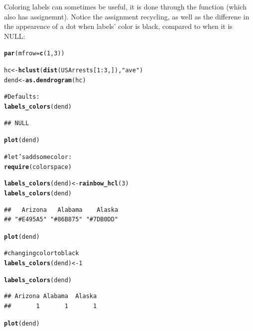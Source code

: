 \documentclass[shortnames,nojss,article]{jss}\usepackage{graphicx, color}
\makeatletter
\newcommand{\hlfunctioncall}[1]{\textcolor[rgb]{0.501960784313725,0,0.329411764705882}{\textbf{#1}}}%
\newcommand{\hlstring}[1]{\textcolor[rgb]{0.6,0.6,1}{#1}}%
\newcommand{\hlcomment}[1]{\textcolor[rgb]{0.180392156862745,0.6,0.341176470588235}{#1}}%
\newenvironment{kframe}{%
 \def\at@end@of@kframe{}%
 \ifinner\ifhmode%
  \def\at@end@of@kframe{\end{minipage}}%
  \begin{minipage}{\columnwidth}%
 \fi\fi%
 \def\FrameCommand##1{\hskip\@totalleftmargin \hskip-\fboxsep
 \colorbox{shadecolor}{##1}\hskip-\fboxsep
     \hskip-\linewidth \hskip-\@totalleftmargin \hskip\columnwidth}%
 \MakeFramed {\advance\hsize-\width
   \@totalleftmargin\z@ \linewidth\hsize
   \@setminipage}}%
 {\par\unskip\endMakeFramed%
 \at@end@of@kframe}
\newenvironment{knitrout}{}{} %
\makeatother
\begin{document}
Coloring labels can sometimes be useful, it is done through the  function (which also has assignemnt). Notice the assignment recycling, as well as the differene in the appearence of a dot when labels' color is black, compared to when it is NULL:

\begin{knitrout}
\color{fgcolor}\begin{kframe}
\begin{alltt}

\hlfunctioncall{par}(mfrow = \hlfunctioncall{c}(1, 3))

hc <- \hlfunctioncall{hclust}(\hlfunctioncall{dist}(USArrests[1:3, ]), \hlstring{"ave"})
dend <- \hlfunctioncall{as.dendrogram}(hc)

\hlcomment{# Defaults:}
\hlfunctioncall{labels_colors}(dend)
\end{alltt}
\begin{verbatim}
## NULL
\end{verbatim}
\begin{alltt}
\hlfunctioncall{plot}(dend)

\hlcomment{# let's add some color:}
\hlfunctioncall{require}(colorspace)
\end{alltt}


{\ttfamily\noindent\itshape\color{messagecolor}{\#\# Loading required package: colorspace}}\begin{alltt}
\hlfunctioncall{labels_colors}(dend) <- \hlfunctioncall{rainbow_hcl}(3)
\hlfunctioncall{labels_colors}(dend)
\end{alltt}
\begin{verbatim}
##   Arizona   Alabama    Alaska 
## "#E495A5" "#86B875" "#7DB0DD"
\end{verbatim}
\begin{alltt}
\hlfunctioncall{plot}(dend)

\hlcomment{# changing color to black}
\hlfunctioncall{labels_colors}(dend) <- 1
\end{alltt}


{\ttfamily\noindent\color{warningcolor}{\#\# Warning: Length of color vector was shorter then the number of leaves - vector color recycled}}\begin{alltt}
\hlfunctioncall{labels_colors}(dend)
\end{alltt}
\begin{verbatim}
## Arizona Alabama  Alaska 
##       1       1       1
\end{verbatim}
\begin{alltt}
\hlfunctioncall{plot}(dend)
\end{alltt}
\end{kframe}


\end{knitrout}
\end{document}
